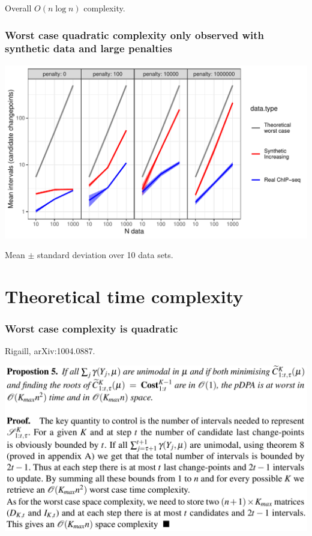 \documentclass{beamer}
\begin{document}
\begin{frame}[fragile]
\begin{minipage}{0.48\textwidth}
    Overall  $O(n \log n)$ complexity.
  \end{minipage}
  
\end{frame}

\begin{frame}
\frametitle{Worst case quadratic complexity only observed with synthetic
  data and large penalties}

\includegraphics[width=\textwidth]{figure-worst-case}

Mean $\pm$ standard deviation over 10 data sets.

\end{frame}

\section{Theoretical time complexity}

\begin{frame}
  \frametitle{Worst case complexity is quadratic}
  Rigaill, arXiv:1004.0887.
  
  \includegraphics[width=\textwidth]{screenshot-proposition-5}
\end{frame}
\end{document}

